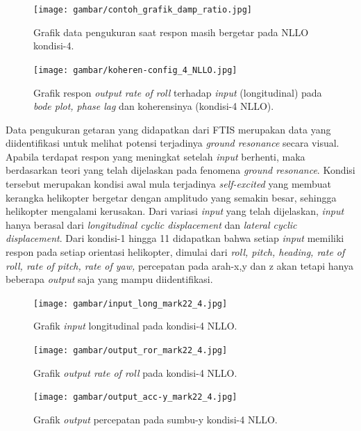 \begin{figure}[H]
	\centering
	\texttt{[image: gambar/contoh\_grafik\_damp\_ratio.jpg]}
	\caption{Grafik data pengukuran saat respon masih bergetar pada NLLO kondisi-4.}
	\label{fig:NLLO-4}
\end{figure}

\begin{figure}[H]
	\centering
	\texttt{[image: gambar/koheren-config\_4\_NLLO.jpg]}
	\caption{Grafik respon \textit{output rate of roll} terhadap \textit{input} (longitudinal) pada \textit{bode plot, phase lag} dan koherensinya (kondisi-4 NLLO).}
	\label{fig:koheren-4_NLLO-4}
\end{figure}

Data pengukuran getaran yang didapatkan dari FTIS merupakan data yang diidentifikasi untuk melihat potensi terjadinya \textit{ground resonance} secara visual. Apabila terdapat respon yang meningkat setelah \textit{input} berhenti, maka berdasarkan teori yang telah dijelaskan pada fenomena \textit{ground resonance}. Kondisi tersebut merupakan kondisi awal mula terjadinya \textit{self-excited} yang membuat kerangka helikopter bergetar dengan amplitudo yang semakin besar, sehingga helikopter mengalami kerusakan. Dari variasi \textit{input} yang telah dijelaskan, \textit{input} hanya berasal dari \textit{longitudinal cyclic displacement} dan \textit{lateral cyclic displacement}. Dari kondisi-1 hingga 11 didapatkan bahwa setiap \textit{input} memiliki respon pada setiap orientasi helikopter, dimulai dari \textit{roll, pitch, heading, rate of roll, rate of pitch, rate of yaw,} percepatan pada arah-x,y dan z akan tetapi hanya beberapa \textit{output} saja yang mampu diidentifikasi. 

\begin{figure}[H]
	\centering
	\texttt{[image: gambar/input\_long\_mark22\_4.jpg]}
	\caption{Grafik \textit{input} longitudinal pada kondisi-4 NLLO.}
	\label{fig:input_long_mark22_4}
\end{figure}

\begin{figure}[H]
	\centering
	\texttt{[image: gambar/output\_ror\_mark22\_4.jpg]}
	\caption{Grafik \textit{output rate of roll} pada kondisi-4 NLLO.}
	\label{fig:output_ROR_mark22_4}
\end{figure}

\begin{figure}[H]
	\centering
	\texttt{[image: gambar/output\_acc-y\_mark22\_4.jpg]}
	\caption{Grafik \textit{output} percepatan pada sumbu-y kondisi-4 NLLO.}
	\label{fig:output_acc-y_mark22_4}
\end{figure}

